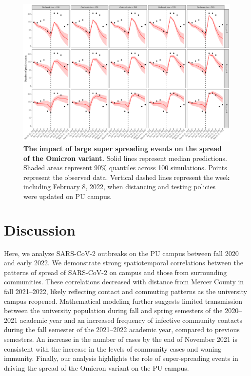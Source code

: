 \documentclass[12pt]{article}
\begin{document}
\begin{figure}[!thp]
\includegraphics[width=\textwidth]{../figure_princeton_new/figure_princeton_simulation_omicron_outbreak.pdf}
\caption{
\textbf{The impact of large super spreading events on the spread of the Omicron variant.}
Solid lines represent median predictions.
Shaded areas represent 90\% quantiles across 100 simulations.
Points represent the observed data.
Vertical dashed lines represent the week including February 8, 2022, when distancing and testing policies were updated on PU campus.
}
\label{fig:omicron2}
\end{figure}

\section*{Discussion}

Here, we analyze SARS-CoV-2 outbreaks on the PU campus between fall 2020 and early 2022.
We demonstrate strong spatiotemporal correlations between the patterns of spread of SARS-CoV-2 on campus and those from surrounding communities.
These correlations decreased with distance from Mercer County in fall 2021--2022, likely reflecting contact and commuting patterns as the university campus reopened.
Mathematical modeling further suggests limited transmission between the university population during fall and spring semesters of the 2020--2021 academic year and an increased frequency of infective community contacts during the fall semester of the 2021--2022 academic year, compared to previous semesters.
An increase in the number of cases by the end of November 2021 is consistent with the increase in the levels of community cases and waning immunity.
Finally, our analysis highlights the role of super-spreading events in driving the spread of the Omicron variant on the PU campus.
\end{document}
